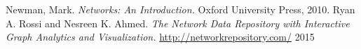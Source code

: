 \documentclass[12pt]{article}
\begin{document}

\begin{thebibliography}{9}
		Newman, Mark. 
		\emph{Networks: An Introduction.} 
		Oxford University Press, 2010.
		Ryan A. Rossi and Nesreen K. Ahmed. 
		\emph{The Network Data Repository with Interactive Graph Analytics and Visualization.}
		\url{http://networkrepository.com/}
		2015
\end{thebibliography}
\end{document}
